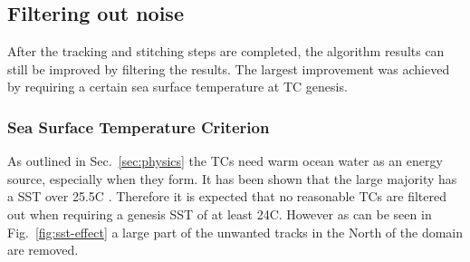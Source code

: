 \subsection{Filtering out noise}
After the tracking and stitching steps are completed, the algorithm results can
still be improved by filtering the results. The largest improvement was
achieved by requiring a certain sea surface temperature at TC genesis.
\subsubsection*{Sea Surface Temperature Criterion}
As outlined in Sec.~\ref{sec:physics} the TCs need warm ocean water as an
energy source, especially when they form. It has been shown that the large
majority has a SST over 25.5\degree C \cite{sst-paper}. Therefore it is
expected that no reasonable TCs are filtered out when requiring a genesis SST
of at least 24\degree C. However as can be seen in Fig.~\ref{fig:sst-effect}
a large part of the unwanted tracks in the North of the domain are removed.
